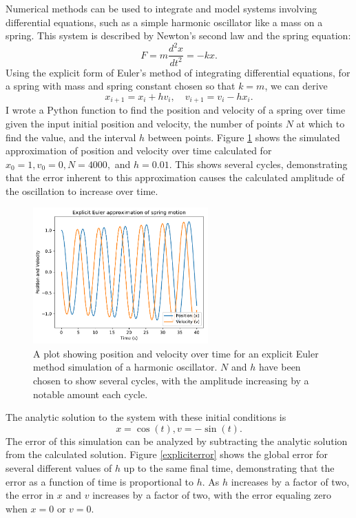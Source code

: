 \documentclass{article}
\begin{document}
Numerical methods can be used to integrate and model systems involving differential equations, such as a simple harmonic oscillator like a mass on a spring. This system is described by Newton's second law and the spring equation: $$F=m\frac{d^2x}{dt^2}=-kx.$$ Using the explicit form of Euler's method of integrating differential equations, for a spring with mass and spring constant chosen so that $k=m$, we can derive $$x_{i+1}=x_i+hv_i,\quad v_{i+1}=v_i-hx_i.$$ I wrote a Python function to find the position and velocity of a spring over time given the input initial position and velocity, the number of points $N$ at which to find the value, and the interval $h$ between points. Figure \ref{eulerexplicit} shows the simulated approximation of position and velocity over time calculated for $x_0=1,v_0=0,N=4000,$ and $h=0.01$. This shows several cycles, demonstrating that the error inherent to this approximation causes the calculated amplitude of the oscillation to increase over time. 

\begin{figure}[H]
	\centering
	\includegraphics[width=0.6\textwidth]{eulerexplicit.pdf}
	\caption{A plot showing position and velocity over time for an explicit Euler method simulation of a harmonic oscillator. $N$ and $h$ have been chosen to show several cycles, with the amplitude increasing by a notable amount each cycle.}
	\label{eulerexplicit}
\end{figure}

The analytic solution to the system with these initial conditions is $$x=\cos(t),v=-\sin(t).$$ The error of this simulation can be analyzed by subtracting the analytic solution from the calculated solution. Figure \ref{expliciterror} shows the global error for several different values of $h$ up to the same final time, demonstrating that the error as a function of time is proportional to $h$. As $h$ increases by a factor of two, the error in $x$ and $v$ increases by a factor of two, with the error equaling zero when $x=0$ or $v=0$.
\end{document}
